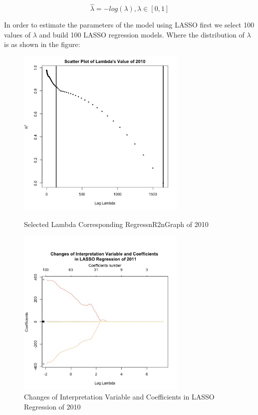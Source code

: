 \documentclass{mcmthesis}
\begin{document}
\begin{equation}
  \hat{\lambda} = −log(\lambda), \lambda \in [0, 1] 
\end{equation}
    

In order to estimate the parameters of the model using LASSO first we select 100 values of $\lambda$ and build 100 LASSO regression models.  Where the distribution of $\lambda$ is as shown in the figure:
\begin{figure}[H]
\centering
\begin{minipage}[t]{0.45\textwidth}
\centering
\includegraphics[width=3.2in]{figures/SelectedLambdaCorrespondingRegressR2Graphof2010}
\caption{Selected Lambda Corresponding RegressnR2nGraph of 2010}
\label{WV 2}
\end{minipage}
\hfill
\begin{minipage}[t]{0.45\textwidth}
\centering
\includegraphics[width=3.2in]{figures/ChangesofInterpretationVariableandCoefficientsinLASSORegressionof2011.jpeg}
\caption{Changes of Interpretation Variable and Coefficients in LASSO Regression of 2010}
\label{Changes of Interpretation Variable and Coefficients in LASSO Regression of 2010}
\end{minipage}
\end{figure}
\end{document}
